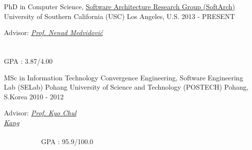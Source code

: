 

\begin{cventries}

  \cventry
    {PhD in Computer Science, \href{http://softarch.usc.edu/} {Software Architecture Research Group (SoftArch)}} %
    {University of Southern California (USC)} %
    {Los Angeles, U.S.} %
	{2013 - PRESENT} %
    {
      \begin{cvitems} %
       	\item Advisor: {\em \href{http://sunset.usc.edu/~neno/}{Prof. Nenad Medvidović} ~~~~~~~~~~~~~~~~~~~~~~~~~~~~~~~~~~~~~~~~~~~~~~~~~~~~~~~~~~~~~~~~~~~~~~~~~~~~~~~~~~~~~~~~~~~~~~~~~~~~~~~~~~~~~~~~~~~~~~~~~~~~~~~~~~~~~~~~~~~}GPA : 3.87/4.00
      \end{cvitems}
    }
    
  \cventry
  {MSc in Information Technology Convergence Engineering, {Software Engineering Lab (SELab)}} %
  {Pohang University of Science and Technology (POSTECH)} %
  {Pohang, S.Korea} %
  {2010 - 2012} %
  {
     	\begin{cvitems} %
     		\item Advisor: {\em \href{http://cse.postech.ac.kr/prof/kck/}{Prof. Kyo Chul Kang}~~~~~~~~~~~~~~~~~~~~~~~~~~~~~~~~~~~~~~~~~~~~~~~~~~~~~~~~~~~~~~~~~~~~~~~~~~~~~~~~~~~~~~~~~~~~~~~~~~~~~~~~~~~~~~~~~~~~~~~~~~~~~~~~~~~~~~~~~~~~~~~~~~} GPA : 95.9/100.0
     	\end{cvitems}
  }
  

\end{cventries}
